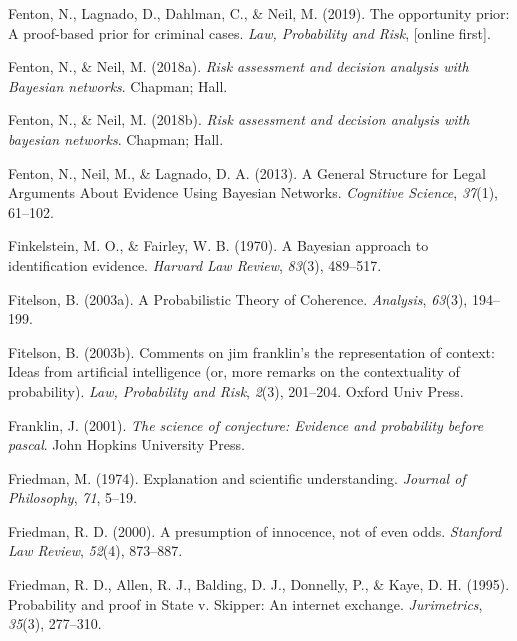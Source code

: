 \documentclass[11pt,dvipsnames,enabledeprecatedfontcommands]{scrartcl}
\begin{document}
\leavevmode\hypertarget{ref-fenton2019OpportunityPriorProofbased}{}%
Fenton, N., Lagnado, D., Dahlman, C., \& Neil, M. (2019). The
opportunity prior: A proof-based prior for criminal cases. \emph{Law,
Probability and Risk}, {[}online first{]}.

\leavevmode\hypertarget{ref-Fenton2018risk}{}%
Fenton, N., \& Neil, M. (2018a). \emph{Risk assessment and decision
analysis with Bayesian networks}. Chapman; Hall.

\leavevmode\hypertarget{ref-Fenton2018Risk}{}%
Fenton, N., \& Neil, M. (2018b). \emph{Risk assessment and decision
analysis with bayesian networks}. Chapman; Hall.

\leavevmode\hypertarget{ref-fenton2013GeneralStructureLegal}{}%
Fenton, N., Neil, M., \& Lagnado, D. A. (2013). A General Structure for
Legal Arguments About Evidence Using Bayesian Networks. \emph{Cognitive
Science}, \emph{37}(1), 61--102.

\leavevmode\hypertarget{ref-Finkelstein1970A}{}%
Finkelstein, M. O., \& Fairley, W. B. (1970). A Bayesian approach to
identification evidence. \emph{Harvard Law Review}, \emph{83}(3),
489--517.

\leavevmode\hypertarget{ref-fitelson2003ProbabilisticTheoryCoherence}{}%
Fitelson, B. (2003a). A Probabilistic Theory of Coherence.
\emph{Analysis}, \emph{63}(3), 194--199.

\leavevmode\hypertarget{ref-fitelson2003comments}{}%
Fitelson, B. (2003b). Comments on jim franklin's the representation of
context: Ideas from artificial intelligence (or, more remarks on the
contextuality of probability). \emph{Law, Probability and Risk},
\emph{2}(3), 201--204. Oxford Univ Press.

\leavevmode\hypertarget{ref-Franklin2001}{}%
Franklin, J. (2001). \emph{The science of conjecture: Evidence and
probability before pascal}. John Hopkins University Press.

\leavevmode\hypertarget{ref-friedman1974}{}%
Friedman, M. (1974). Explanation and scientific understanding.
\emph{Journal of Philosophy}, \emph{71}, 5--19.

\leavevmode\hypertarget{ref-Friedman2000}{}%
Friedman, R. D. (2000). A presumption of innocence, not of even odds.
\emph{Stanford Law Review}, \emph{52}(4), 873--887.

\leavevmode\hypertarget{ref-friedmanEtAl1995}{}%
Friedman, R. D., Allen, R. J., Balding, D. J., Donnelly, P., \& Kaye, D.
H. (1995). Probability and proof in State v. Skipper: An internet
exchange. \emph{Jurimetrics}, \emph{35}(3), 277--310.
\end{document}
